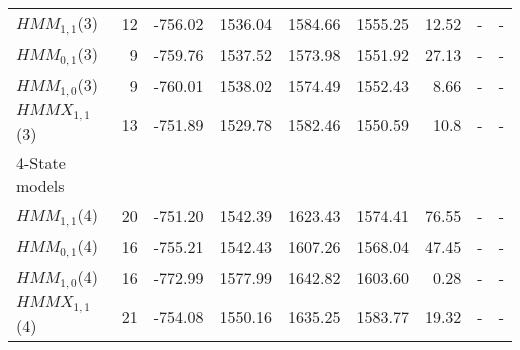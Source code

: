 \documentclass[11pt,a4paper,oneside]{article}
\begin{document}
\begin{table}[h!]
\begin{tabular}{lrrrrrrrr}
\hspace{3mm}$HMM_{1,1}$(3) & 12 & -756.02 & 1536.04 & 1584.66 & 1555.25 & 12.52 & - & -  \\

\hspace{3mm}$HMM_{0,1}$(3) & 9 & -759.76 & 1537.52 & 1573.98 & 1551.92 & 27.13 & - & -  \\

\hspace{3mm}$HMM_{1,0}$(3) & 9 & -760.01 & 1538.02 & 1574.49 & 1552.43 & 8.66 & - & -  \\

\hspace{3mm}$HMMX_{1,1}$(3)& 13 & -751.89 & 1529.78 & 1582.46 & 1550.59 & 10.8 & - & -  \\

4-State models & & & & & & &  \\ 

\hspace{3mm}$HMM_{1,1}$(4) & 20 & -751.20 & 1542.39 & 1623.43 & 1574.41
 & 76.55 & - & - \\

\hspace{3mm}$HMM_{0,1}$(4) & 16 & -755.21 & 1542.43 & 1607.26 & 1568.04 & 47.45 & - & - \\

\hspace{3mm}$HMM_{1,0}$(4) & 16 & -772.99 & 1577.99 & 1642.82 & 1603.60 & 0.28 & - & - \\

\hspace{3mm}$HMMX_{1,1}$(4)& 21 & -754.08 & 1550.16 & 1635.25 & 1583.77 & 19.32 & - & -  \\






\end{tabular}
\end{table}
\end{document}
